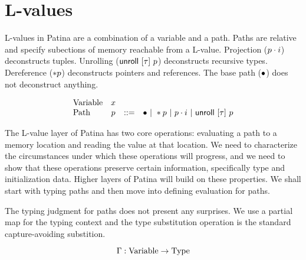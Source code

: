 \section*{L-values}

L-values in Patina are a combination of a variable and a path.
Paths are relative and specify subections of memory reachable from a L-value.
Projection (${p}\cdot{i}$) deconstructs tuples.
Unrolling ($\mathsf{unroll}~[{\tau}]~{p}$) deconstructs recursive types.
Dereference ($*{p}$) deconstructs pointers and references.
The base path ($\bullet$) does not deconstruct anything.

\[
\begin{array}{lccl}
\textrm{Variable} & x & & \\
\textrm{Path} & p & ::= & \bullet ~|~ *{p} ~|~ {p}\cdot{i} ~|~ \mathsf{unroll}~[{\tau}]~{p} \\
\end{array}
\]

The L-value layer of Patina has two core operations: evaluating a path
to a memory location and reading the value at that location.
We need to characterize the circumstances under which these operations will progress,
and we need to show that these operations preserve certain information, specifically
type and initialization data. Higher layers of Patina will build on these properties.
We shall start with typing paths and then move into defining evaluation for paths.

The typing judgment for paths does not present any surprises.
We use a partial map for the typing context and
the type substitution operation is the standard capture-avoiding substition.

$$ \Gamma : \mathrm{Variable} \to \mathrm{Type} $$



